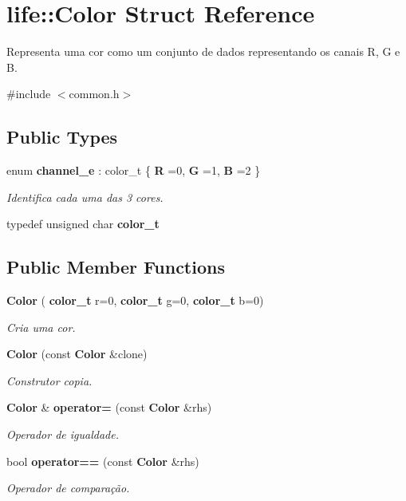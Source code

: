 \section{life\+:\+:Color Struct Reference}
\label{structlife_1_1_color}


Representa uma cor como um conjunto de dados representando os canais R, G e B.  




{\ttfamily \#include $<$common.\+h$>$}

\subsection*{Public Types}
\begin{DoxyCompactItemize}
\item 
enum \textbf{ channel\+\_\+e} \+: color\+\_\+t \{ \textbf{ R} =0, 
\textbf{ G} =1, 
\textbf{ B} =2
 \}\begin{DoxyCompactList}\small\item\em Identifica cada uma das 3 cores. \end{DoxyCompactList}
\item 
typedef unsigned char \textbf{ color\+\_\+t}
\end{DoxyCompactItemize}
\subsection*{Public Member Functions}
\begin{DoxyCompactItemize}
\item 
\mbox{\label{structlife_1_1_color_a828b52fdeb6cea04ae182dea36272538}} 
\textbf{ Color} (\textbf{ color\+\_\+t} r=0, \textbf{ color\+\_\+t} g=0, \textbf{ color\+\_\+t} b=0)
\begin{DoxyCompactList}\small\item\em Cria uma cor. \end{DoxyCompactList}\item 
\mbox{\label{structlife_1_1_color_a4c5b4ec3378b240824d16ae0e7870b44}} 
\textbf{ Color} (const \textbf{ Color} \&clone)
\begin{DoxyCompactList}\small\item\em Construtor copia. \end{DoxyCompactList}\item 
\mbox{\label{structlife_1_1_color_a36338f7acd471d208faeffae1e24bcf2}} 
\textbf{ Color} \& \textbf{ operator=} (const \textbf{ Color} \&rhs)
\begin{DoxyCompactList}\small\item\em Operador de igualdade. \end{DoxyCompactList}\item 
\mbox{\label{structlife_1_1_color_a5c68002aa56cf5932c14ff2f1bf7f24b}} 
bool \textbf{ operator==} (const \textbf{ Color} \&rhs)
\begin{DoxyCompactList}\small\item\em Operador de comparação. \end{DoxyCompactList}\end{DoxyCompactItemize}
